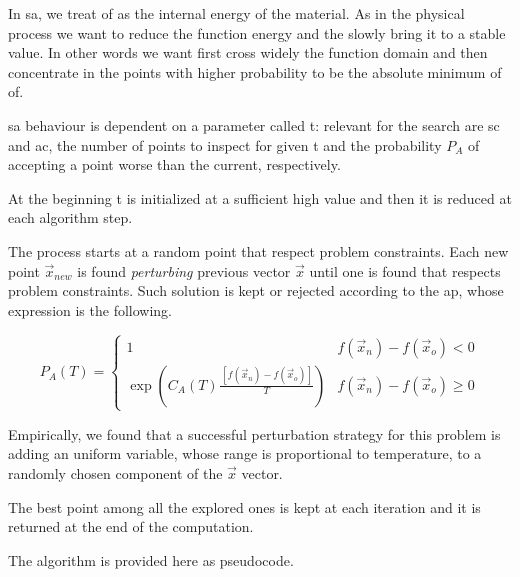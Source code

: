 \documentclass[journal]{IEEEtran}
\begin{document}
In \gls{sa}, we treat \gls{of} as the internal energy of the material.
As in the physical process we want to reduce the function energy and the slowly bring it to a stable value. In other words we want first cross widely the function domain and then concentrate in the points with higher probability to be the absolute minimum of \gls{of}.

\gls{sa} behaviour is dependent on a parameter called \gls{t}: relevant for the search are \gls{sc} and \gls{ac}, the number of points to inspect for given \gls{t} and the probability $P_A$ of accepting a point worse than the current, respectively.

At the beginning \gls{t} is initialized at a sufficient high value and then it is reduced at each algorithm step.

The process starts at a random point that respect problem constraints. Each new point $\vec{x}_{new}$ is found \emph{perturbing} previous vector $\vec{x}$ until one is found that respects problem constraints.
Such solution is kept or rejected according to the \gls{ap}, whose expression is the following.

 \begin{equation*} \label{accept_prob}
	P_A(T) = \begin{cases}
		1 & f(\vec{x}_n)-f (\vec{x}_o) < 0 \\
		\exp{ \left( C_A(T) \frac{
					\, [f(\vec{x}_n) - f(\vec{x}_o)] }{T} \right) }
		& f (\vec{x}_n)-f(\vec{x}_o) \geq 0
  \end{cases}
 \end{equation*}

Empirically, we found that a successful perturbation strategy for this problem is adding an uniform variable, whose range is proportional to temperature, to a randomly chosen component of the $\vec{x}$ vector.

The best point among all the explored ones is kept at each iteration and it is returned at the end of the computation.

The algorithm is provided here as pseudocode.
\end{document}
